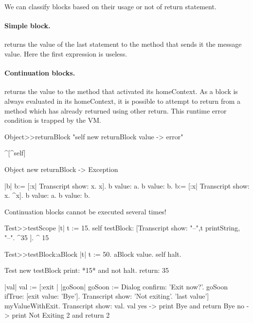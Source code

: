 \documentclass[a4paper,10pt,twoside]{book}
\begin{document}
We can classify blocks based on their usage or not of return statement. 

\paragraph{Simple block.} \ct{[:x :y| x*x. x+y]} returns the value of the last statement to the method that sends it the message value. Here the first expression is useless.

\paragraph{Continuation blocks.} \ct{[:x :y| x*x. ^ x + y]} returns the value to the method that activated its homeContext. As a block is always evaluated in its homeContext, it is possible to attempt to return from a method which has already returned using other return. This runtime error condition is trapped by the VM.

\begin{code}{}
Object>>returnBlock
	"self new returnBlock value -> error"

	^[^self]

Object new returnBlock
-> Exception
\end{code}	
	
	
\begin{code}{}
|b| 
b:= [:x| Transcript show: x. x].
b value: a. b value: b.
b:= [:x| Transcript show: x. ^x].
b value: a. b value: b.
\end{code}
 
Continuation blocks cannot be executed several times!

\begin{code}{}
Test>>testScope
	   |t|
    	t := 15.
	   self testBlock: [Transcript show: "--",t printString, "--".
	   ^35 ].
    ^ 15

Test>>testBlock:aBlock
	   |t|
	   t := 50.
	   aBlock value.
	   self halt.
\end{code}

\begin{code}{}
Test new testBlock 	
print: *15* and not halt. 
return: 35
\end{code}


\begin{code}{}
|val|
val := [:exit |
		|goSoon|
		goSoon := Dialog confirm: 'Exit now?'.
		goSoon ifTrue: [exit value: 'Bye'].
		Transcript show: 'Not exiting'.
		'last value'] myValueWithExit.
Transcript show: val.
val
yes -> print Bye and return  Bye
no -> print Not Exiting 2 and return 2
\end{code}
\end{document}
